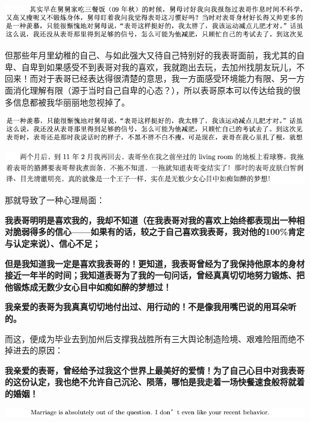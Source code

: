 \documentclass[9pt, b5paper]{article}
\begin{document}
\begin{center}
\includegraphics[width=.9\linewidth]{./pic/backups_plans_20210426_162643.png}
\end{center}

但那些年月里幼稚的自己、与如此强大又待自己特别好的我表哥面前，我尤其的自卑、自卑到如果感受不到表哥对我的喜欢，我就跑出去玩，去加州找朋友玩儿，不回来！而对于表哥已经表达得很清楚的意思，我一方面感受环境能力有限、另一方面消化理解有限（源于当时自己自卑的心态？），所以表哥原本可以传达给我的很多信息都被我华丽丽地忽视掉了。

\begin{center}
\includegraphics[width=.9\linewidth]{./pic/backups_plans_20210426_163310.png}
\end{center}

\begin{center}
\includegraphics[width=.9\linewidth]{./pic/backups_plans_20210426_163417.png}
\end{center}

那就导致了一种心理局面：

\textbf{我表哥明明是喜欢我的，我却不知道（在我表哥对我的喜欢上始终都表现出一种相对脆弱得多的信心——如果有的话，较之于自己喜欢我表哥，我对他的100\%肯定与认定来说）、信心不足；}

\textbf{但是我知道我一定是喜欢我表哥的！更知道，我表哥曾经为了我保持他原本的身材接近一年半的时间；我知道表哥为了我的一句问话，曾经真真切切地努力锻炼、把他锻炼成无数少女心目中如痴如醉的梦想过！}

\textbf{我亲爱的表哥为我真真切切地付出过、用行动的！不是像我用嘴巴说的用耳朵听的。}

而这，便成为毕业去到加州后支撑我战胜所有三大舆论制造险境、艰难险阻而绝不掉进去的原因：

\textbf{我亲爱的表哥，曾经给予过我这个世界上最美好的爱情！为了自己心目中对我表哥的这份认定，我也绝不允许自己沉沦、陨落，哪怕是我走着一场快餐速食般将就着的婚姻！}

\begin{center}
\includegraphics[width=.9\linewidth]{./pic/backups_plans_20210426_165635.png}
\end{center}
\end{document}
